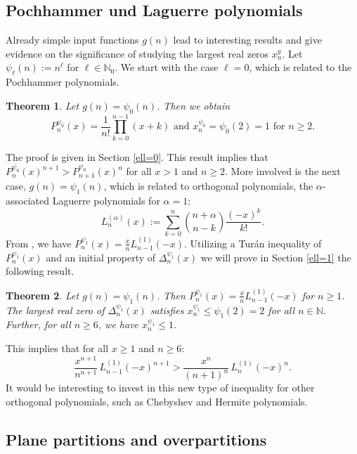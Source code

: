 \documentclass[11pt,reqno]{amsart}
\theoremstyle{plain}
\newtheorem{theorem}{Theorem}[section]
\theoremstyle{remark}
\theoremstyle{definition}
\numberwithin{equation}{section}
\begin{document}
\subsection{Pochhammer und Laguerre
polynomials} \label{sect:pola}
Already simple input functions $g(n)$ lead to interesting results and give
evidence on the
significance of studying the largest real zeros $x_n^g$.
Let $\psi_{\ell}(n):= n^{\ell}$ for $\ell \in \mathbb{N}_0$.
We start with the case $\ell=0$, which is related to
the Pochhammer polynomials.
\begin{theorem} \label{Pochhammer}
Let $g(n)= \psi_0(n)$. Then we obtain
\begin{equation*}
P_n^{\psi_0}(x) = \frac{1}{n!} \prod_{k=0}^{n-1} \left( x+k \right)
\text{ and } x_n^{\psi_0}=\psi_0(2)=1 \text{ for } n\geq 2.
\end{equation*}
\end{theorem}
The proof is given in Section \ref{ell=0}. This result implies
that $P_n^{\psi_0}(x)^{n+1}> P_{n+1}^{\psi_0}(x)^{n}$
for all $x>1$ and $n \geq 2$. 
More involved is the next case, $g(n)=\psi_1(n)$, which is related to orthogonal polynomials, the $\alpha$-associated Laguerre polynomials for $\alpha=1$:
\begin{equation*}\label{alpha=1}
L_n^{(\alpha)}(x) :=  \sum_{k=0}^n \binom{n+\alpha}{n-k}  \frac{(-x)^k}{k!}.
\end{equation*}
From \cite{HLN19}, we have 
$P_n^{\psi_1}(x) = \frac{x}{n} L_{n-1}^{(1)} (-x)$.
Utilizing a
Tur\'{a}n inequality of $P_n^{\psi_1}(x)$ \cite{HNT22} and an
initial property of $\Delta_n^{\psi_1}(x)$ we will prove in Section \ref{ell=1}
the following result.
\begin{theorem} \label{th:ell=1}
Let $g(n)= \psi_1(n)$. Then $P_n^{\psi_1}(x) = \frac{x}{n} L_{n-1}^{(1)} (-x)$ for $n\geq 1$. The largest real
zero of $\Delta_n^{\psi_1}(x)$ satisfies $x_n^{\psi_1} \leq
{\psi_1}(2)=2$ for all $n\in \mathbb{N}$. Further, for all $n \geq 6$, we have $x_n^{\psi_1} \leq 1$.
\end{theorem}
This implies that for all $x \geq 1$ and $n\geq 6$:
\begin{equation*}
\frac{x^{n+1}}{n^{n+1}} \, L_{n-1}^{(1)}(-x)^{n+1} >  
\frac{x^{n}}{(n+1)^{n}} \, L_{n}^{(1)}(-x)^{n}.
\end{equation*}
It would be interesting to invest in this new type of inequality for
other orthogonal polynomials, such
as Chebyshev and Hermite polynomials.
\subsection{Plane
partitions and
overpartitions}
\end{document}
